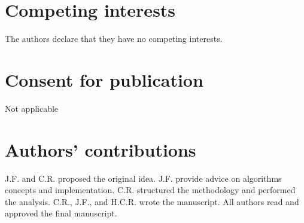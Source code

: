 \section*{Competing interests}
The authors declare that they have no competing interests.

\section*{Consent for publication}%
Not applicable

\section*{Authors' contributions}
J.F. and C.R. proposed the original idea. 
J.F. provide advice on algorithms concepts and implementation.
C.R. structured the methodology and performed the analysis. 
C.R., J.F., and H.C.R. wrote the manuscript.
All authors read and approved the final manuscript.
